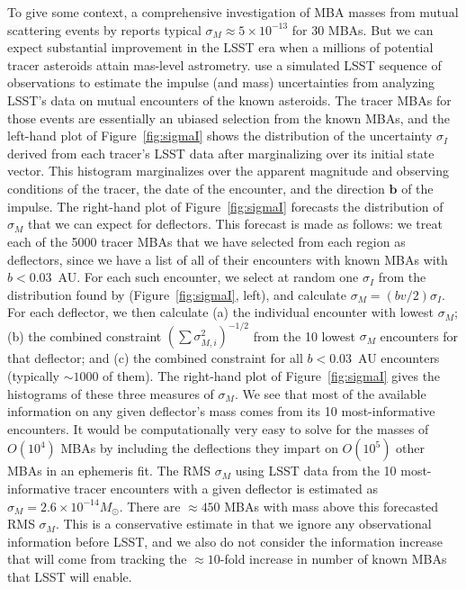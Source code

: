 \documentclass[linenumbers, onecolumn]{aastex631}
\newcommand{\bhat}{\mathbf{\hat b}}
\begin{document}
To give some context, a
comprehensive investigation of MBA masses from mutual scattering
events by \citet{goffin} reports typical $\sigma_M\approx
5\times10^{-13}$ for 30 MBAs. But we can expect substantial improvement
in the LSST era when a millions of potential tracer asteroids attain
mas-level astrometry. \citet{negin} use a simulated LSST sequence of observations to estimate the impulse (and mass) uncertainties from analyzing LSST's data on mutual encounters of the known asteroids. The tracer MBAs for those events are essentially an ubiased selection from the known MBAs, and the left-hand plot of Figure~\ref{fig:sigmaI} shows the distribution of the uncertainty $\sigma_I$ derived from each tracer's LSST data after marginalizing over its initial state vector.  This histogram marginalizes over the apparent magnitude and observing conditions of the tracer, the date of the encounter, and the direction $\bhat$ of the impulse.  The right-hand plot of Figure~\ref{fig:sigmaI} forecasts the distribution of $\sigma_M$ that we can expect for deflectors.  This forecast is made as follows: we treat each of the 5000 tracer MBAs that we have selected from each region as deflectors, since we have a list of all of their encounters with known MBAs with $b<0.03$~AU.  For each such encounter, we select at random one $\sigma_I$ from the distribution found by \citet{negin} (Figure~\ref{fig:sigmaI}, left), and calculate $\sigma_M=(bv/2)\sigma_I.$  For each deflector, we then calculate (a) the individual encounter with lowest $\sigma_M$; (b) the combined constraint $\left(\sum \sigma_{M,i}^2\right)^{-1/2}$ from the 10 lowest $\sigma_M$ encounters for that deflector; and (c) the combined constraint for all $b<0.03$~AU encounters (typically $\sim1000$ of them).  The right-hand plot of Figure~\ref{fig:sigmaI} gives the histograms of these three measures of $\sigma_M.$  We see that most of the available information on any given deflector's mass comes from its 10 most-informative encounters.  It would be computationally very easy to solve for the masses of $O(10^4)$ MBAs by including the deflections they impart on $O(10^5)$ other MBAs in an ephemeris fit.
The RMS $\sigma_M$ using LSST data from the 10 most-informative tracer encounters with a given deflector is estimated as $\sigma_M=2.6\times10^{-14}M_\odot.$ There are $\approx450$ MBAs with mass above this forecasted RMS $\sigma_M.$  This is a conservative estimate in that we ignore any observational information before LSST, and we also do not consider the information increase that will come from tracking the $\approx10$-fold increase in number of known MBAs that LSST will enable.  
\end{document}
